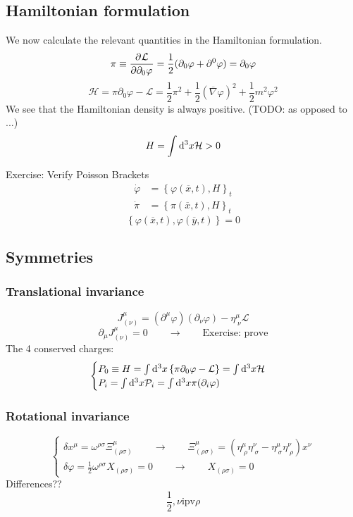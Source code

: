 \subsection{Hamiltonian formulation}
We now calculate the relevant quantities in the Hamiltonian formulation.
\[ \pi \equiv  \frac{\partial{^{}}\mathcal{L}}{\partial{{\partial_0\varphi}^{}}}  = \frac{1}{2}(\partial_0 \varphi + \partial^0 \varphi) = \partial_0 \varphi \]
\[ \mathcal{H} = \pi \partial_0\varphi - \mathcal{L} = \frac{1}{2}\pi^2 + \frac{1}{2}(\overline{\nabla}\varphi)^2 + \frac{1}{2}m^2\varphi^2 \]
We see that the Hamiltonian density is always positive. (TODO: as opposed to ...)
\[ H = \int \operatorname{d \!}{^3x}\mathcal{H} > 0 \]

\begin{example}
Exercise: Verify Poisson Brackets
\begin{align*}
\dot{\varphi} &= \left\{\varphi(\overline{x},t), H\right\}_t \\
\dot{\pi} &= \left\{\pi(\overline{x},t), H\right\}_t
\end{align*}
\[ \left\{\varphi(\overline{x},t), \varphi(\overline{y},t)\right\} = 0 \]
\end{example}

\subsection{Symmetries}
\subsubsection{Translational invariance}
\[J^\mu_{(\nu)} = (\partial^\mu\varphi)(\partial_\nu\varphi) - \eta^\mu_{\;\nu}\mathcal{L}\]
\[ \partial_\mu J^\mu_{(\nu)} = 0 \qquad \to \qquad \text{Exercise: prove} \]
The 4 conserved charges:
\[\begin{cases}
P_0 \equiv H = \int \operatorname{d \!}{^3x}\left\{\pi\partial_0\varphi-\mathcal{L}\right\} = \int \operatorname{d \!}{^3x}\mathcal{H} \\
P_i = \int \operatorname{d \!}{^3x}\mathcal{P}_i = \int \operatorname{d \!}{^3x} \pi(\partial_i\varphi)
\end{cases}\]

\subsubsection{Rotational invariance}

\[\begin{cases}
\delta x^\mu = \omega^{\rho\sigma}\Xi^\mu_{(\rho\sigma)} \qquad \to \qquad \Xi^\mu_{(\rho\sigma)} = \left(\eta^\mu_{\;\rho}\eta^\nu_{\;\sigma}-\eta^\mu_{\;\sigma}\eta^\nu_{\;\rho}\right)x^\nu \\
\delta \varphi = \frac{1}{2}\omega^{\rho\sigma}X_{(\rho\sigma)} = 0 \qquad \to \qquad X_{(\rho\sigma)} = 0
\end{cases} \]
Differences??
\[ \frac{1}{2},\nu \text{ipv} \rho \]

